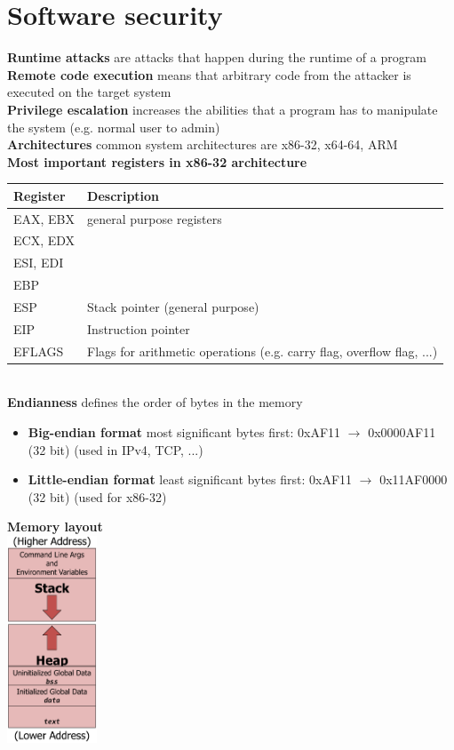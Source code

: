 \documentclass[12pt]{article}
\begin{document}
	\section{Software security}
	\textbf{Runtime attacks} are attacks that happen during the runtime of a program\\
	\textbf{Remote code execution} means that arbitrary code from the attacker is executed on the target system\\
	\textbf{Privilege escalation} increases the abilities that a program has to manipulate the system (e.g. normal user to admin)\\
	\textbf{Architectures} common system architectures are x86-32, x64-64, ARM\\
	\textbf{Most important registers in x86-32 architecture}\\
	\begin{tabular}{|l|l|}
		\hline 
		\textbf{Register} & \textbf{Description} \\ 
		\hline 
		EAX, EBX & general purpose registers \\ 
		ECX, EDX &  \\ 
		ESI, EDI &  \\ 
		EBP &  \\ 
		\hline 
		ESP & Stack pointer (general purpose) \\ 
		\hline 
		EIP & Instruction pointer \\ 
		\hline 
		EFLAGS & Flags for arithmetic operations (e.g. carry flag, overflow flag, ...) \\ 
		\hline 
	\end{tabular}\\
	\textbf{Endianness} defines the order of bytes in the memory
	\begin{itemize}
		\item \textbf{Big-endian format} most significant bytes first: 0xAF11 $\rightarrow$ 0x0000AF11 (32 bit) (used in IPv4, TCP, ...)
		\item \textbf{Little-endian format} least significant bytes first: 0xAF11 $\rightarrow$ 0x11AF0000 (32 bit) (used for x86-32)
	\end{itemize}
	\textbf{Memory layout}\\
	\includegraphics[width=0.2\textwidth]{figures/memory-layout.png}\\
\end{document}

